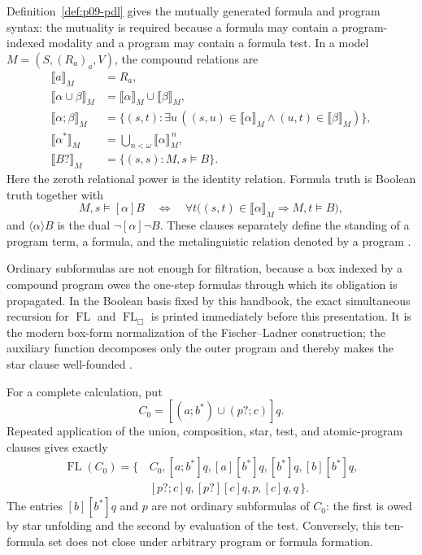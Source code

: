 Definition~\ref{def:p09-pdl} gives the mutually generated formula and program
syntax: the mutuality is required because a formula may contain a
program-indexed modality and a program may contain a formula test.  In a model
\(M=(S,(R_a)_a,V)\), the compound relations are
\[
\begin{aligned}
 \llbracket a\rrbracket_M&=R_a,\\
 \llbracket\alpha\cup\beta\rrbracket_M
   &=\llbracket\alpha\rrbracket_M\cup\llbracket\beta\rrbracket_M,\\
 \llbracket\alpha;\beta\rrbracket_M
   &=\{(s,t):\exists u\,
       ((s,u)\in\llbracket\alpha\rrbracket_M\land
        (u,t)\in\llbracket\beta\rrbracket_M)\},\\
 \llbracket\alpha^{*}\rrbracket_M
   &=\bigcup_{n<\omega}\llbracket\alpha\rrbracket_M^{\,n},\\
 \llbracket B?\rrbracket_M
   &=\{(s,s):M,s\models B\}.
\end{aligned}
\]
Here the zeroth relational power is the identity relation.  Formula truth is
Boolean truth together with
\[
 M,s\models[\alpha]B
 \quad\Longleftrightarrow\quad
 \forall t\bigl((s,t)\in\llbracket\alpha\rrbracket_M
                 \Longrightarrow M,t\models B\bigr),
\]
and \(\langle\alpha\rangle B\) is the dual
\(\neg[\alpha]\neg B\).  These clauses separately define the standing of a
program term, a formula, and the metalinguistic relation denoted by a program
\cite[\S\S1--2]{FischerLadner1979}.

Ordinary subformulas are not enough for filtration, because a box indexed by a
compound program owes the one-step formulas through which its obligation is
propagated.  In the Boolean basis fixed by this handbook, the exact simultaneous
recursion for \(\operatorname{FL}\) and
\(\operatorname{FL}_{\Box}\) is printed immediately before this presentation.
It is the modern box-form normalization of the Fischer--Ladner construction;
the auxiliary function decomposes only the outer program and thereby makes the
star clause well-founded \cite[\S6.1]{HarelKozenTiuryn2000}.

For a complete calculation, put
\[
 C_0=\left[(a;b^{*})\cup(p?;c)\right]q.
\]
Repeated application of the union, composition, star, test, and atomic-program
clauses gives exactly
\[
\begin{aligned}
 \operatorname{FL}(C_0)=\{\,
   &C_0,
   [a;b^{*}]q,
   [a][b^{*}]q,
   [b^{*}]q,
   [b][b^{*}]q,\\
   &[p?;c]q,
   [p?][c]q,
   p,
   [c]q,
   q
 \,\}.
\end{aligned}
\]
The entries \([b][b^{*}]q\) and \(p\) are not ordinary subformulas of
\(C_0\): the first is owed by star unfolding and the second by evaluation of the
test.  Conversely, this ten-formula set does not close under arbitrary program
or formula formation.

